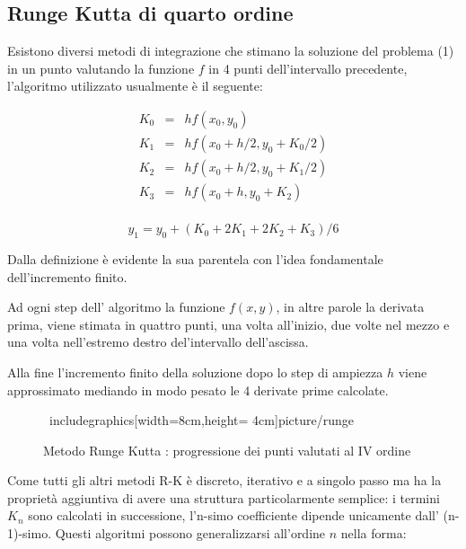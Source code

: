 \documentclass[11pt]{article}
\begin{document}
\subsection{Runge Kutta di quarto ordine}

Esistono diversi metodi di integrazione che stimano la soluzione del problema (1) in un punto valutando la funzione $f$ in 4 punti dell'intervallo precedente,  l'algoritmo utilizzato usualmente è il seguente:

\begin{displaymath}
	\begin{array}{rcl}
				K_{0} & = & h f(x_{0} , y_{0}) \\
				K_{1} & = & h f(x_{0} + h/2 , y_{0} + K_{0}/2) \\
				K_{2} & = & h f(x_{0} + h/2 , y_{0} + K_{1}/2) \\
				K_{3} & = & h f(x_{0} + h , y_{0} + K_{2}) \\
	\end{array}
\end{displaymath}

	\begin{equation}
	y_{1} = y_{0} + ( K_{0} + 2 K_{1} + 2 K_{2} + K_{3})/6
	\end{equation}
  
Dalla definizione è evidente la sua parentela con l'idea fondamentale dell'incremento finito. 

Ad ogni step dell' algoritmo la funzione $f(x,y)$, in altre parole la derivata prima, viene stimata in quattro punti, una volta all'inizio, due volte nel mezzo e una volta nell'estremo destro del'intervallo dell'ascissa. 

Alla fine l'incremento finito della soluzione dopo lo step di ampiezza $h$ viene approssimato mediando in modo pesato le 4 derivate prime calcolate.

\begin{figure}[!h]
\caption{Metodo Runge Kutta : progressione dei punti valutati al IV ordine}
\
includegraphics[width=8cm,height= 4cm]{picture/runge}
\centering
\label{fig:correttore}
\end{figure}

Come tutti gli altri metodi R-K è discreto, iterativo e a singolo passo ma ha la proprietà aggiuntiva di avere una struttura particolarmente semplice: i termini $K_{n}$ sono calcolati in successione, l'n-simo coefficiente dipende unicamente dall' (n-1)-simo. Questi algoritmi possono generalizzarsi all'ordine $n$ nella forma:
\end{document}
